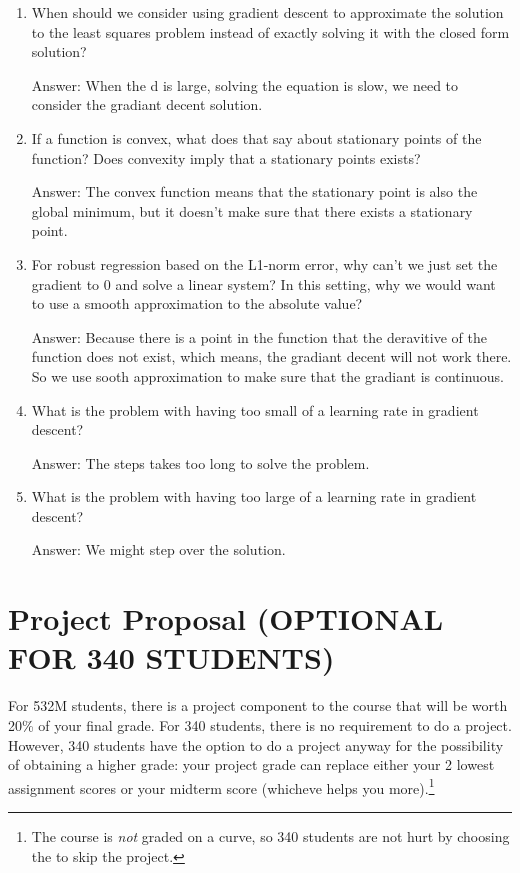 \documentclass{article}
\def\ans#1{\par\gre{Answer: #1}}
\def\gre#1{{\color{gre}#1}}
\begin{document}
\begin{enumerate}
\item When should we consider using gradient descent to approximate the solution to the least squares problem instead of exactly solving it with the closed form solution?  \ans{When the d is large, solving the equation is slow, we need to consider the gradiant decent solution.}
\item If a function is convex, what does that say about stationary points of the function? Does convexity imply that a stationary points exists? \ans{The convex function means that the stationary point is also the global minimum, but it doesn't make sure that there exists a stationary point.}
\item For robust regression based on the L1-norm error, why can't we just set the gradient to 0 and solve a linear system? In this setting, why we would want to use a smooth approximation to the absolute value? \ans{Because there is a point in the function that the deravitive of the function does not exist, which means, the gradiant decent will not work there. So we use sooth approximation to make sure that the gradiant is continuous.}
\item What is the problem with having too small of a learning rate in gradient descent? \ans{The steps takes too long to solve the problem.}
\item What is the problem with having too large of a learning rate in gradient descent? \ans{We might step over the solution.}
\end{enumerate}


\section*{Project Proposal (OPTIONAL FOR 340 STUDENTS)}

For 532M students, there is a project component to the course that will be worth 20\% of your final grade. For 340 students, there is no requirement to do a project. However, 340 students have the option to do a project anyway for the possibility of obtaining a higher grade: your project grade can replace either your 2 lowest assignment scores or your midterm score (whicheve helps you more).\footnote{The course is \emph{not} graded on a curve, so 340 students are not hurt by choosing the to skip the project.}
\end{document}

